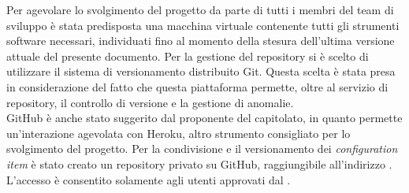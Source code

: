 			Per agevolare lo svolgimento del progetto da parte di tutti i membri del team di sviluppo è stata predisposta una macchina virtuale contenente tutti gli strumenti software necessari, individuati fino al momento della stesura dell'ultima versione attuale del presente documento.
			\label{sec:SceltaRepository}
				Per la gestione del repository si è scelto di utilizzare il sistema di versionamento distribuito Git. Questa scelta è stata presa in considerazione del fatto che questa piattaforma permette, oltre al servizio di repository, il controllo di versione e la gestione di anomalie. \\
				GitHub è anche stato suggerito dal proponente del capitolato, in quanto permette un'interazione agevolata con Heroku, altro strumento consigliato per lo svolgimento del progetto. 
					Per la condivisione e il versionamento dei \textit{configuration item} è stato creato un repository privato su GitHub, raggiungibile all’indirizzo . L’accesso è consentito solamente agli utenti approvati dal .